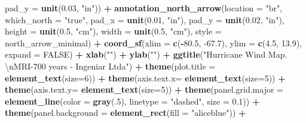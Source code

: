 \documentclass[12pt,twoside]{reedthesis}
\newenvironment{Shaded}{\begin{snugshade}}{\end{snugshade}}
\newcommand{\CharTok}[1]{\textcolor[rgb]{0.31,0.60,0.02}{#1}}
\newcommand{\DataTypeTok}[1]{\textcolor[rgb]{0.13,0.29,0.53}{#1}}
\newcommand{\DecValTok}[1]{\textcolor[rgb]{0.00,0.00,0.81}{#1}}
\newcommand{\FloatTok}[1]{\textcolor[rgb]{0.00,0.00,0.81}{#1}}
\newcommand{\KeywordTok}[1]{\textcolor[rgb]{0.13,0.29,0.53}{\textbf{#1}}}
\newcommand{\NormalTok}[1]{#1}
\newcommand{\OperatorTok}[1]{\textcolor[rgb]{0.81,0.36,0.00}{\textbf{#1}}}
\newcommand{\OtherTok}[1]{\textcolor[rgb]{0.56,0.35,0.01}{#1}}
\newcommand{\StringTok}[1]{\textcolor[rgb]{0.31,0.60,0.02}{#1}}
\begin{document}
\begin{Shaded}
\begin{Highlighting}[]
   \DataTypeTok{pad_y =} \KeywordTok{unit}\NormalTok{(}\FloatTok{0.03}\NormalTok{, }\StringTok{"in"}\NormalTok{)) }\OperatorTok{+}\StringTok{ }
\StringTok{  }\KeywordTok{annotation_north_arrow}\NormalTok{(}\DataTypeTok{location =} \StringTok{"br"}\NormalTok{, }\DataTypeTok{which_north =} \StringTok{"true"}\NormalTok{, }\DataTypeTok{pad_x =} \KeywordTok{unit}\NormalTok{(}\FloatTok{0.01}\NormalTok{, }\StringTok{"in"}\NormalTok{), }\DataTypeTok{pad_y =} \KeywordTok{unit}\NormalTok{(}\FloatTok{0.02}\NormalTok{, }\StringTok{"in"}\NormalTok{), }\DataTypeTok{height =} \KeywordTok{unit}\NormalTok{(}\FloatTok{0.5}\NormalTok{, }\StringTok{"cm"}\NormalTok{), }
   \DataTypeTok{width =} \KeywordTok{unit}\NormalTok{(}\FloatTok{0.5}\NormalTok{, }\StringTok{"cm"}\NormalTok{), }\DataTypeTok{style =}\NormalTok{ north_arrow_minimal) }\OperatorTok{+}
\StringTok{  }\KeywordTok{coord_sf}\NormalTok{(}\DataTypeTok{xlim =} \KeywordTok{c}\NormalTok{(}\OperatorTok{-}\FloatTok{80.5}\NormalTok{, }\FloatTok{-67.7}\NormalTok{), }\DataTypeTok{ylim =} \KeywordTok{c}\NormalTok{(}\FloatTok{4.5}\NormalTok{, }\FloatTok{13.9}\NormalTok{), }\DataTypeTok{expand =} \OtherTok{FALSE}\NormalTok{) }\OperatorTok{+}
\StringTok{  }\KeywordTok{xlab}\NormalTok{(}\StringTok{""}\NormalTok{) }\OperatorTok{+}\StringTok{ }
\StringTok{  }\KeywordTok{ylab}\NormalTok{(}\StringTok{""}\NormalTok{) }\OperatorTok{+}\StringTok{ }
\StringTok{  }\KeywordTok{ggtitle}\NormalTok{(}\StringTok{"Hurricane Wind Map. }\CharTok{\textbackslash{}n}\StringTok{MRI-700 years - Ingeniar Ltda"}\NormalTok{) }\OperatorTok{+}\StringTok{ }
\StringTok{  }\KeywordTok{theme}\NormalTok{(}\DataTypeTok{plot.title =} \KeywordTok{element_text}\NormalTok{(}\DataTypeTok{size=}\DecValTok{6}\NormalTok{)) }\OperatorTok{+}
\StringTok{  }\KeywordTok{theme}\NormalTok{(}\DataTypeTok{axis.text.x=} \KeywordTok{element_text}\NormalTok{(}\DataTypeTok{size=}\DecValTok{5}\NormalTok{)) }\OperatorTok{+}\StringTok{ }
\StringTok{  }\KeywordTok{theme}\NormalTok{(}\DataTypeTok{axis.text.y=} \KeywordTok{element_text}\NormalTok{(}\DataTypeTok{size=}\DecValTok{5}\NormalTok{)) }\OperatorTok{+}
\StringTok{  }\KeywordTok{theme}\NormalTok{(}\DataTypeTok{panel.grid.major =} \KeywordTok{element_line}\NormalTok{(}\DataTypeTok{color =} \KeywordTok{gray}\NormalTok{(.}\DecValTok{5}\NormalTok{), }\DataTypeTok{linetype =} \StringTok{"dashed"}\NormalTok{, }\DataTypeTok{size =} \FloatTok{0.1}\NormalTok{)) }\OperatorTok{+}
\StringTok{  }\KeywordTok{theme}\NormalTok{(}\DataTypeTok{panel.background =} \KeywordTok{element_rect}\NormalTok{(}\DataTypeTok{fill =} \StringTok{"aliceblue"}\NormalTok{)) }\OperatorTok{+}

\end{Highlighting}
\end{Shaded}
\end{document}
